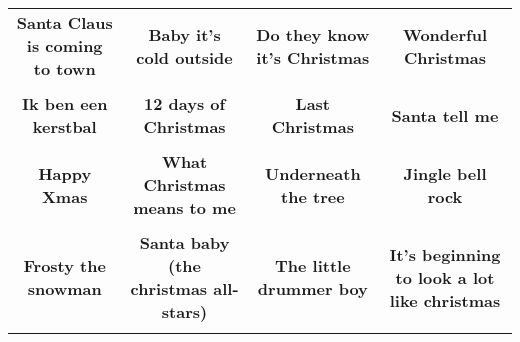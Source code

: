 \documentclass[12pt]{article} \usepackage{eso-pic, graphicx}
\newcommand{\background}[1]{%
\AddToShipoutPictureBG*{\texttt{[image: \#1]}}
}
\begin{document}
\tabcolsep=30.2pt \renewcommand{\arraystretch}{4.5}   \vspace*{4.3cm} \begin{center}  \begin{tabular}{c c c c}
\parbox{3cm}{\centering \textbf{Santa Claus is coming to town}}& 
\parbox{3cm}{\centering \textbf{Baby it’s cold outside}}& 
\parbox{3cm}{\centering \textbf{Do they know it's Christmas}}& 
\parbox{3cm}{\centering \textbf{Wonderful Christmas}}\\ \\ 
\parbox{3cm}{\centering \textbf{Ik ben een kerstbal}}& 
\parbox{3cm}{\centering \textbf{12 days of Christmas}}& 
\parbox{3cm}{\centering \textbf{Last Christmas}}& 
\parbox{3cm}{\centering \textbf{Santa tell me}}\\ \\ 
\parbox{3cm}{\centering \textbf{Happy Xmas}}& 
\parbox{3cm}{\centering \textbf{What Christmas means to me}}& 
\parbox{3cm}{\centering \textbf{Underneath the tree}}& 
\parbox{3cm}{\centering \textbf{Jingle bell rock}}\\ \\ 
\parbox{3cm}{\centering \textbf{Frosty the snowman}}& 
\parbox{3cm}{\centering \textbf{Santa baby (the christmas all-stars)}}& 
\parbox{3cm}{\centering \textbf{The little drummer boy}}& 
\parbox{3cm}{\centering \textbf{It’s beginning to look a lot like christmas}}\\ \\ 
\end{tabular} \background{discobingo.pdf} \end{center} 
\end{document}
